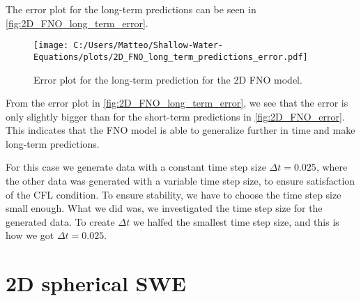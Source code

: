 The error plot for the long-term predictions can be seen in \autoref{fig:2D_FNO_long_term_error}.
\begin{figure}[H]
    \centering
    \texttt{[image: C:/Users/Matteo/Shallow-Water-Equations/plots/2D\_FNO\_long\_term\_predictions\_error.pdf]}
    \caption{Error plot for the long-term prediction for the 2D FNO model.}\label{fig:2D_FNO_long_term_error}
\end{figure}
From the error plot in \autoref{fig:2D_FNO_long_term_error}, we see that the error is only slightly bigger than for the short-term predictions in \autoref{fig:2D_FNO_error}.
This indicates that the FNO model is able to generalize further in time and make long-term predictions.

For this case we generate data with a constant time step size $\Delta t = 0.025$, where the other data was generated with a variable time step size, to ensure satisfaction of the CFL condition.
To ensure stability, we have to choose the time step size small enough. 
What we did was, we investigated the time step size for the generated data. To create $\Delta t$ we halfed the smallest time step size, and this is how we got $\Delta t = 0.025$.


\section{2D spherical SWE}




